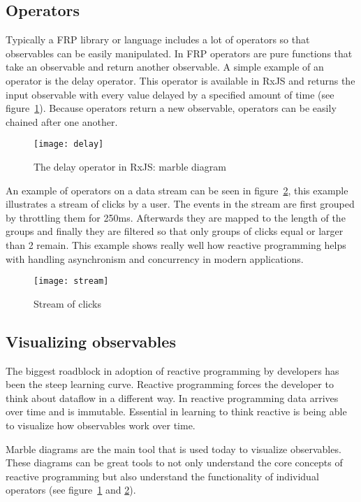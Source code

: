 \subsection{Operators}

Typically a FRP library or language includes a lot of operators \cite{intro-reactive} so that observables can be easily manipulated. In FRP operators are pure functions that take an observable and return another observable. A simple example of an operator is the delay operator. This operator is available in RxJS and returns the input observable with every value delayed by a specified amount of time \cite{delay} (see figure~\ref{figure:delay}). Because operators return a new observable, operators can be easily chained after one another.

\begin{figure}[H]
	\centering
	\texttt{[image: delay]}
	\caption{The delay operator in RxJS: marble diagram \cite{delay}}
	\label{figure:delay}
\end{figure}

An example of operators on a data stream can be seen in figure~\ref{figure:stream}, this example illustrates a stream of clicks by a user. The events in the stream are first grouped by throttling them for 250ms. Afterwards they are mapped to the length of the groups and finally they are filtered so that only groups of clicks equal or larger than 2 remain. This example shows really well how reactive programming helps with handling asynchronism and concurrency in modern applications.

\begin{figure}[H]
	\centering
	\texttt{[image: stream]}
	\caption{Stream of clicks \cite{intro-reactive}}
	\label{figure:stream}
\end{figure}

\subsection{Visualizing observables}

The biggest roadblock in adoption of reactive programming by developers has been the steep learning curve. Reactive programming forces the developer to think about dataflow in a different way. In reactive programming data arrives over time and is immutable. Essential in learning to think reactive is being able to visualize how observables work over time.

Marble diagrams are the main tool that is used today to visualize observables. These diagrams can be great tools to not only understand the core concepts of reactive programming but also understand the functionality of individual operators (see figure~\ref{figure:delay} and \ref{figure:stream}).

